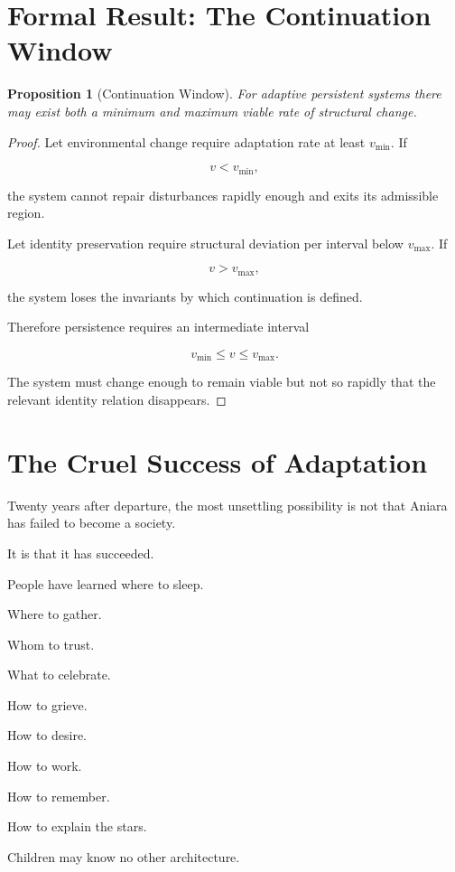 \documentclass[11pt,oneside]{book}
\newtheorem{proposition}[theorem]{Proposition}
\theoremstyle{definition}
\theoremstyle{remark}
\begin{document}
\section{Formal Result: The Continuation Window}

\begin{proposition}[Continuation Window]
For adaptive persistent systems there may exist both a minimum and maximum viable rate of structural change.
\end{proposition}

\begin{proof}
Let environmental change require adaptation rate at least \(v_{\min}\). If

\[
v<v_{\min},
\]

the system cannot repair disturbances rapidly enough and exits its admissible region.

Let identity preservation require structural deviation per interval below \(v_{\max}\). If

\[
v>v_{\max},
\]

the system loses the invariants by which continuation is defined.

Therefore persistence requires an intermediate interval

\[
v_{\min}\leq v\leq v_{\max}.
\]

The system must change enough to remain viable but not so rapidly that the relevant identity relation disappears.
\end{proof}

\section{The Cruel Success of Adaptation}

Twenty years after departure, the most unsettling possibility is not that Aniara has failed to become a society.

It is that it has succeeded.

People have learned where to sleep.

Where to gather.

Whom to trust.

What to celebrate.

How to grieve.

How to desire.

How to work.

How to remember.

How to explain the stars.

Children may know no other architecture.
\end{document}
